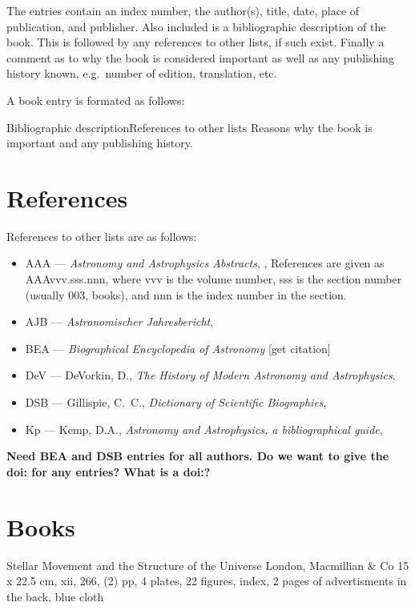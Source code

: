 The entries contain an index number, the author(s), title, date, place
of publication, and publisher.  Also included is a bibliographic description of the 
book.  This is followed by any references to other lists, if such exist. Finally
a comment as to why the book is considered important as well as any publishing
history known, e.g.\ number of edition, translation, etc.

A book entry is formated as follows:

{Bibliographic description}{References to other lists}
Reasons why the book is important and any publishing history.

\section*{References}
References to other lists are as follows:
\begin{itemize}
\item AAA --- \emph{Astronomy and Astrophysics Abstracts}, \cite{aaa:1969},
References are given as AAAvvv.sss.nnn, where vvv is the volume number, sss is the section number (usually 003, books), and nnn is the index number in the section.
\item AJB --- \emph{Astronomischer Jahresbericht}, \cite{ajr:1900}
\item BEA --- \emph{Biographical Encyclopedia of Astronomy} [get citation]
\item DeV --- DeVorkin, D., \emph{The History of Modern Astronomy and Astrophysics},
\cite{devorkin:1982}
\item DSB --- Gillispie, C.\ C., \emph{Dictionary of Scientific Biographies}, \cite{gillispie:1970}
\item Kp --- Kemp, D.A., \emph{Astronomy and Astrophysics, a bibliographical guide}, \cite{kemp:1970}
\end{itemize}

\textbf{Need BEA and DSB entries for all authors. Do we want to give the doi: for any entries?
What is a doi:?}
\newpage

\section*{Books}
\setcounter{bksctr}{0}

{Stellar Movement and the Structure of the Universe}
{London, Macmillian \& Co}
{15 x 22.5 cm, xii, 266, (2) pp, 4 plates, 22 figures, index, 2 pages of advertisments
in the back, blue cloth}
{}

